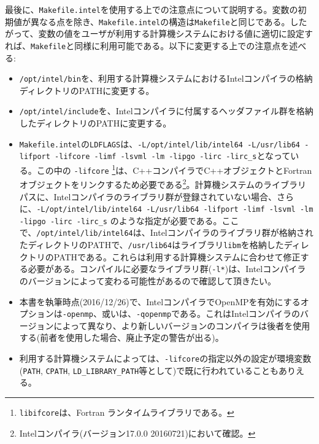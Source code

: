 最後に、\texttt{Makefile.intel}を使用する上での注意点について説明する。変数の初期値が異なる点を除き、\texttt{Makefile.intel}の構造は\texttt{Makefile}と同じである。したがって、変数の値をユーザが利用する計算機システムにおける値に適切に設定すれば、\texttt{Makefile}と同様に利用可能である。以下に変更する上での注意点を述べる:
\begin{itemize}[leftmargin=*]
\item \texttt{/opt/intel/bin}を、利用する計算機システムにおけるIntelコンパイラの格納ディレクトリのPATHに変更する。
\item \texttt{/opt/intel/include}を、Intelコンパイラに付属するヘッダファイル群を格納したディレクトリのPATHに変更する。
\item \texttt{Makefile.intel}の\texttt{LDFLAGS}は、\texttt{-L/opt/intel/lib/intel64 -L/usr/lib64 -lifport -lifcore -limf -lsvml -lm -lipgo -lirc -lirc\_s}となっている。\newline この中の \texttt{-lifcore} \protect\footnote{\texttt{libifcore}は、Fortran ランタイムライブラリである。}は、C++コンパイラでC++オブジェクトとFortranオブジェクトをリンクするため必要である\footnote{Intelコンパイラ(バージョン17.0.0 20160721)において確認。}。計算機システムのライブラリパスに、Intelコンパイラのライブラリ群が登録されていない場合、さらに、\texttt{-L/opt/intel/lib/intel64 -L/usr/lib64 -lifport -limf -lsvml -lm -lipgo -lirc -lirc\_s} のような指定が必要である。\newline ここで、\texttt{/opt/intel/lib/intel64}は、Intelコンパイラのライブラリ群が格納されたディレクトリのPATHで、\texttt{/usr/lib64}はライブラリ\texttt{libm}を格納したディレクトリのPATHである。これらは利用する計算機システムに合わせて修正する必要がある。コンパイルに必要なライブラリ群(\texttt{-l*})は、Intelコンパイラのバージョンによって変わる可能性があるので確認して頂きたい。
\item 本書を執筆時点(2016/12/26)で、IntelコンパイラでOpenMPを有効にするオプションは\texttt{-openmp}、或いは、\texttt{-qopenmp}である。これはIntelコンパイラのバージョンによって異なり、より新しいバージョンのコンパイラは後者を使用する(前者を使用した場合、廃止予定の警告が出る)。
\item 利用する計算機システムによっては、\texttt{-lifcore}の指定以外の設定が環境変数(\texttt{PATH}, \texttt{CPATH}, \texttt{LD\_LIBRARY\_PATH}等として)で既に行われていることもありえる。
\end{itemize}
\endifFtn
\ifC %
